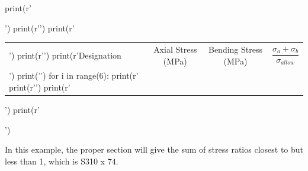 \documentclass[
10pt,
a4paper,
openany,
svgnames,
]{book}
\begin{document}
\begin{solution}
  \begin{pycode}
    print(r'\begin{table}[H]')
    print(r'\centering')
    print(r'\begin{tabular}{lccc}')
    print(r'\toprule')
    print(r'Designation & Axial Stress (MPa) & Bending Stress (MPa) & $\dfrac{\sigma _a + \sigma_b}{\sigma_{allow}}$ \\')
    print('\midrule')
    for i in range(6):
        print(r'%
    print(r'\bottomrule')
    print(r'\end{tabular}')
    print(r'\end{table}')
  \end{pycode}

  In this example, the proper section will give the sum of stress ratios closest to but less than 1, which is S310 x 74.
\end{solution}
\end{document}
